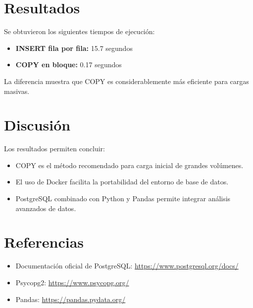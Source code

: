 \documentclass[12pt]{article}
\begin{document}
\section{Resultados}
Se obtuvieron los siguientes tiempos de ejecución:
\begin{itemize}
    \item \textbf{INSERT fila por fila:} 15.7 segundos
    \item \textbf{COPY en bloque:} 0.17 segundos
\end{itemize}

La diferencia muestra que COPY es considerablemente más eficiente para cargas masivas.

\section{Discusión}
Los resultados permiten concluir:
\begin{itemize}
    \item COPY es el método recomendado para carga inicial de grandes volúmenes.
    \item El uso de Docker facilita la portabilidad del entorno de base de datos.
    \item PostgreSQL combinado con Python y Pandas permite integrar análisis avanzados de datos.
\end{itemize}

\section*{Referencias}
\begin{itemize}
    \item Documentación oficial de PostgreSQL: \url{https://www.postgresql.org/docs/}
    \item Psycopg2: \url{https://www.psycopg.org/}
    \item Pandas: \url{https://pandas.pydata.org/}
\end{itemize}
\end{document}
